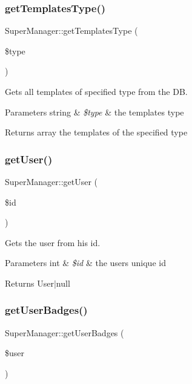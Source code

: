 \subsubsection{\texorpdfstring{get\+Templates\+Type()}{getTemplatesType()}}
{\footnotesize\ttfamily Super\+Manager\+::get\+Templates\+Type (\begin{DoxyParamCaption}\item[{}]{\$type }\end{DoxyParamCaption})}

Gets all templates of specified type from the DB. 
\begin{DoxyParams}[1]{Parameters}
string & {\em \$type} & the template\textquotesingle{}s type \\
\hline
\end{DoxyParams}
\begin{DoxyReturn}{Returns}
array the templates of the specified type 
\end{DoxyReturn}
\mbox{\label{classSuperManager_a6a3faf8b26e39f4aa770f089b79b16cf}} 
\subsubsection{\texorpdfstring{get\+User()}{getUser()}}
{\footnotesize\ttfamily Super\+Manager\+::get\+User (\begin{DoxyParamCaption}\item[{}]{\$id }\end{DoxyParamCaption})}

Gets the user from his id. 
\begin{DoxyParams}[1]{Parameters}
int & {\em \$id} & the user\textquotesingle{}s unique id \\
\hline
\end{DoxyParams}
\begin{DoxyReturn}{Returns}
User$\vert$null 
\end{DoxyReturn}
\mbox{\label{classSuperManager_aad2062dca6a3577a9d852c4edf9b1189}} 
\subsubsection{\texorpdfstring{get\+User\+Badges()}{getUserBadges()}}
{\footnotesize\ttfamily Super\+Manager\+::get\+User\+Badges (\begin{DoxyParamCaption}\item[{}]{\$user }\end{DoxyParamCaption})}

